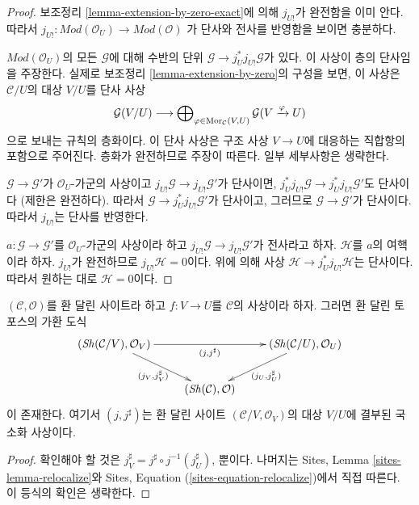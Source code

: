 \begin{proof}
보조정리 \ref{lemma-extension-by-zero-exact}에 의해 $j_{U!}$가 완전함을
이미 안다. 따라서
$j_{U!} :  \textit{Mod}(\mathcal{O}_U) \to \textit{Mod}(\mathcal{O})$
가 단사와 전사를 반영함을 보이면 충분하다.

\medskip\noindent
$\textit{Mod}(\mathcal{O}_U)$의 모든 $\mathcal{G}$에 대해 수반의 단위
$\mathcal{G} \to j_U^*j_{U!}\mathcal{G}$가 있다. 이 사상이 층의 단사임을
주장한다. 실제로 보조정리 \ref{lemma-extension-by-zero}의 구성을 보면,
이 사상은 $\mathcal{C}/U$의 대상 $V/U$를 단사 사상
$$
\mathcal{G}(V/U) \longrightarrow
\bigoplus\nolimits_{\varphi \in \mathop{\mathrm{Mor}}\nolimits_\mathcal{C}(V, U)}
\mathcal{G}(V \xrightarrow{\varphi} U)
$$
으로 보내는 규칙의 층화이다. 이 단사 사상은 구조 사상 $V \to U$에
대응하는 직합항의 포함으로 주어진다. 층화가 완전하므로 주장이 따른다.
일부 세부사항은 생략한다.

\medskip\noindent
$\mathcal{G} \to \mathcal{G}'$가 $\mathcal{O}_U$-가군의 사상이고
$j_{U!}\mathcal{G} \to j_{U!}\mathcal{G}'$가 단사이면,
$j_U^*j_{U!}\mathcal{G} \to j_U^*j_{U!}\mathcal{G}'$도 단사이다
(제한은 완전하다). 따라서
$\mathcal{G} \to j_U^*j_{U!}\mathcal{G}'$가 단사이고, 그러므로
$\mathcal{G} \to \mathcal{G}'$가 단사이다. 따라서 $j_{U!}$는 단사를
반영한다.

\medskip\noindent
$a : \mathcal{G} \to \mathcal{G}'$를 $\mathcal{O}_U$-가군의 사상이라 하고
$j_{U!}\mathcal{G} \to j_{U!}\mathcal{G}'$가 전사라고 하자.
$\mathcal{H}$를 $a$의 여핵이라 하자. $j_{U!}$가 완전하므로
$j_{U!}\mathcal{H} = 0$이다. 위에 의해 사상
$\mathcal{H} \to j^*_U j_{U!}\mathcal{H}$는 단사이다. 따라서 원하는 대로
$\mathcal{H} = 0$이다.
\end{proof}

\begin{lemma}
\label{lemma-relocalize}
$(\mathcal{C}, \mathcal{O})$를 환 달린 사이트라 하고
$f : V \to U$를 $\mathcal{C}$의 사상이라 하자. 그러면 환 달린 토포스의
가환 도식
$$
\xymatrix{
(\Sh(\mathcal{C}/V), \mathcal{O}_V)
\ar[rd]_{(j_V, j_V^\sharp)} \ar[rr]_{(j, j^\sharp)} & &
(\Sh(\mathcal{C}/U), \mathcal{O}_U)
\ar[ld]^{(j_U, j_U^\sharp)} \\
& (\Sh(\mathcal{C}), \mathcal{O}) &
}
$$
이 존재한다. 여기서 $(j, j^\sharp)$는 환 달린 사이트
$(\mathcal{C}/V, \mathcal{O}_V)$의 대상 $V/U$에 결부된 국소화 사상이다.
\end{lemma}

\begin{proof}
확인해야 할 것은
$j_V^\sharp = j^\sharp \circ j^{-1}(j_U^\sharp)$,
뿐이다. 나머지는 Sites, Lemma \ref{sites-lemma-relocalize}와
Sites, Equation (\ref{sites-equation-relocalize})에서 직접 따른다.
이 등식의 확인은 생략한다.
\end{proof}


